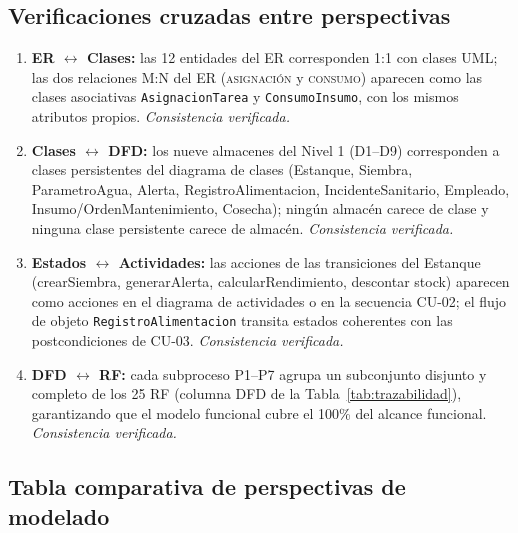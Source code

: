\documentclass[11pt,a4paper]{article}
\renewcommand{\_}{\textunderscore\allowbreak}
\begin{document}
\subsection{Verificaciones cruzadas entre perspectivas}
\begin{enumerate}[leftmargin=1.6em]
  \item \textbf{ER $\leftrightarrow$ Clases:} las 12 entidades del ER corresponden 1:1 con clases UML; las dos relaciones M:N del ER (\textsc{asignación} y \textsc{consumo}) aparecen como las clases asociativas \texttt{AsignacionTarea} y \texttt{ConsumoInsumo}, con los mismos atributos propios. \textit{Consistencia verificada.}
  \item \textbf{Clases $\leftrightarrow$ DFD:} los nueve almacenes del Nivel 1 (D1--D9) corresponden a clases persistentes del diagrama de clases (Estanque, Siembra, ParametroAgua, Alerta, RegistroAlimentacion, IncidenteSanitario, Empleado, Insumo/OrdenMantenimiento, Cosecha); ningún almacén carece de clase y ninguna clase persistente carece de almacén. \textit{Consistencia verificada.}
  \item \textbf{Estados $\leftrightarrow$ Actividades:} las acciones de las transiciones del Estanque (crearSiembra, generarAlerta, calcularRendimiento, descontar stock) aparecen como acciones en el diagrama de actividades o en la secuencia CU-02; el flujo de objeto \texttt{RegistroAlimentacion} transita estados coherentes con las postcondiciones de CU-03. \textit{Consistencia verificada.}
  \item \textbf{DFD $\leftrightarrow$ RF:} cada subproceso P1--P7 agrupa un subconjunto disjunto y completo de los 25 RF (columna DFD de la Tabla~\ref{tab:trazabilidad}), garantizando que el modelo funcional cubre el 100\% del alcance funcional. \textit{Consistencia verificada.}
\end{enumerate}

\subsection{Tabla comparativa de perspectivas de modelado}

\renewcommand{\arraystretch}{1.2}
\end{document}
